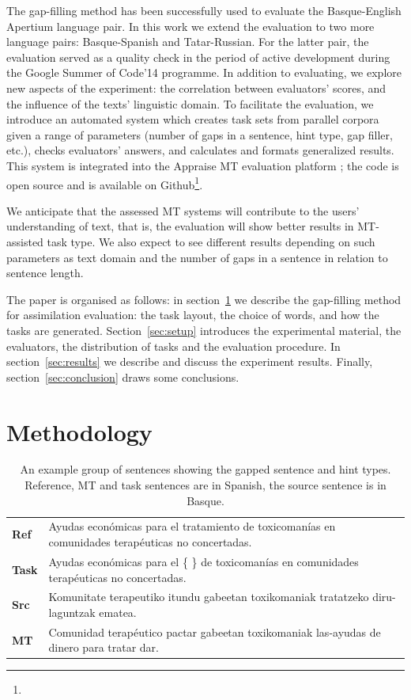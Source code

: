 \documentclass[11pt]{article}
\newcommand{\comment}[1]{\marginpar{\scriptsize\sf \textcolor{blue}{#1}}}
\begin{document}
\comment{EA: I understand we selected tat-rus and eng-kaz because they were in development. why did we select eu-es?}
The gap-filling method has been successfully used to evaluate the Basque-English Apertium language pair. In this work we extend the evaluation to two more language pairs: Basque-Spanish and Tatar-Russian. For the latter pair, the evaluation served as a quality check in the period of active development during the Google Summer of Code'14 programme. In addition to evaluating, we explore new aspects of the experiment: the correlation between evaluators' scores, and the influence of the texts' linguistic domain. To facilitate the evaluation, we introduce an automated system which creates task sets from parallel corpora given a range of parameters (number of gaps in a sentence, hint type, gap filler, etc.), checks evaluators' answers, and calculates and formats generalized results. This system is integrated into the Appraise MT evaluation platform \citep{federmann12}; the code is open source and is available on Github\footnote{}.

We anticipate that the assessed MT systems will contribute to the users' understanding of text, that is, the evaluation will show better results in MT-assisted task type. We also expect to see different results depending on such parameters as text domain and the number of gaps in a sentence in relation to sentence length.

The paper is organised as follows: in section~\ref{sec:methodology} we describe the gap-filling method for assimilation evaluation: the task layout, the choice of words, and how the tasks are generated. Section~\ref{sec:setup} introduces the experimental material, the evaluators, the distribution of tasks and the evaluation procedure. In section~\ref{sec:results} we describe and discuss the experiment results. Finally, section~\ref{sec:conclusion} draws some conclusions.


\section{Methodology}
\label{sec:methodology}

\begin{table}
  \begin{tabular}{|l|l|}
     \hline
     \textbf{Ref}   & Ayudas econ\'{o}micas para el tratamiento de toxicoman\'{i}as en comunidades terap\'{e}uticas no concertadas. \\
     \textbf{Task}   & Ayudas econ\'{o}micas para el \{ \} de toxicoman\'{i}as en comunidades terap\'{e}uticas no concertadas. \\
     \textbf{Src} & Komunitate terapeutiko itundu gabeetan toxikomaniak tratatzeko diru-laguntzak ematea. \\
     \textbf{MT}     & Comunidad terap\'{e}utico pactar gabeetan toxikomaniak las-ayudas de dinero para tratar dar. \\
     \hline
  \end{tabular}
  \caption{An example group of sentences showing the gapped sentence and hint types. Reference, MT and task sentences are in Spanish, the source sentence is in Basque.} 
  \label{table:example}
\end{table}
\end{document}
